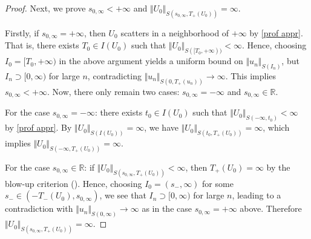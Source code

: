 \documentclass[reqno, 11pt]{amsart}
\numberwithin{equation}{section}
\newcommand{\R}{\mathbb{R}}
\theoremstyle{plain}
\theoremstyle{definition}
\numberwithin{equation}{section}
\numberwithin{theorem}{section}
\numberwithin{equation}{section}
\numberwithin{equation}{section}
\numberwithin{theorem}{section}
\begin{document}
\begin{proof}
		Next, we prove $s_{0,\infty}<+\infty$ and $\Vert U_0 \Vert_{S(s_{0,\infty},T_+(U_0))}=\infty$. 
		
		Firstly, if $s_{0,\infty}=+\infty$, then $U_0$ scatters in a neighborhood of $+\infty$ by \eqref{prof appr}. That is, there exists $T_0\in I(U_0)$ such that $\Vert U_0 \Vert_{S([T_0,+\infty))}<\infty$. Hence, choosing $I_0=[T_0,+\infty)$ in the above argument yields a uniform bound on $\Vert u_n\Vert_{S(I_n)}$, but $I_n\supset[0,\infty)$ for large $n$, contradicting $\Vert u_n\Vert_{S(0,T_+(u_n))}\rightarrow\infty$. This implies $s_{0,\infty}<+\infty$. Now, there only remain two cases: $s_{0,\infty}=-\infty$ and $s_{0,\infty}\in\R$. 
		
		For the case $s_{0,\infty}=-\infty$: there exists $t_0\in I(U_0)$ such that $\Vert U_0 \Vert_{S(-\infty,t_0)}<\infty$ by \eqref{prof appr}. By $\Vert U_0\Vert_{S(I(U_0))}=\infty$, we have $\Vert U_0 \Vert_{S(t_0,T_+(U_0))}=\infty$, which implies $\Vert U_0 \Vert_{S(-\infty,T_+(U_0))}=\infty$.
		
		For the case $s_{0,\infty}\in\R$: if $\Vert U_0 \Vert_{S(s_{0,\infty},T_+(U_0))}<\infty$, then $T_+(U_0)=\infty$ by the blow-up criterion (\cite[Proposition 2.2]{MXZ:crit Hart:f rad}). Hence, choosing $I_0=(s_-,\infty)$ for some $s_-\in(-T_-(U_0),s_{0,\infty})$, we see that $I_n\supset[0,\infty)$ for large $n$, leading to a contradiction with $\Vert u_n\Vert_{S(0,\infty)}\rightarrow\infty$ as in the case $s_{0,\infty}=+\infty$ above. Therefore $\Vert U_0 \Vert_{S(s_{0,\infty},T_+(U_0))}=\infty$.
		

\end{proof}
\end{document}
